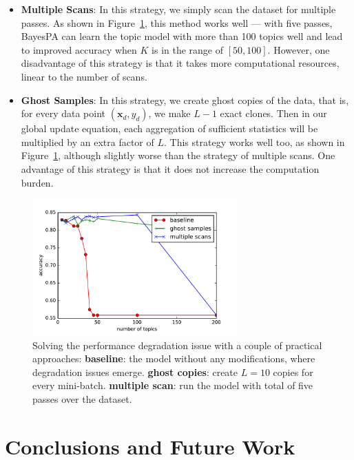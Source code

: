 \documentclass[twoside,11pt]{article}
\newcommand{\xv}{\bm{x}}
\begin{document}
\begin{itemize}
	\item {\bf Multiple Scans}: In this strategy, we simply scan the dataset for multiple passes. As shown in Figure~\ref{fg:solve_degradation}, this method works well --- with five passes, BayesPA can learn the topic model with more than 100 topics well and lead to improved accuracy when $K$ is in the range of $[50, 100 ]$. However, one disadvantage of this strategy is that it takes more computational resources, linear to the number of scans.
	\item {\bf Ghost Samples}: In this strategy, we create ghost copies of the data, that is, for every data point $(\xv_d, y_d)$, we make $L-1$ exact clones. Then in our global update equation, each aggregation of sufficient statistics will be multiplied by an extra factor of $L$. This strategy works well too, as shown in Figure~\ref{fg:solve_degradation}, although slightly worse than the strategy of multiple scans. One advantage of this strategy is that it does not increase the computation burden.
\end{itemize}

\begin{figure}[t]
\centering
	\includegraphics[width=0.7\textwidth]{plot_solve_degradation}
	\caption{Solving the performance degradation issue with a couple of practical approaches: \textbf{baseline}: the model without any modifications, where degradation issues emerge. \textbf{ghost copies}: create $L = 10$ copies for every mini-batch. \textbf{multiple scan}: run the model with total of five passes over the dataset.}
	\label{fg:solve_degradation}
\end{figure}








\section{Conclusions and Future Work}
\label{sec:con}
\end{document}
